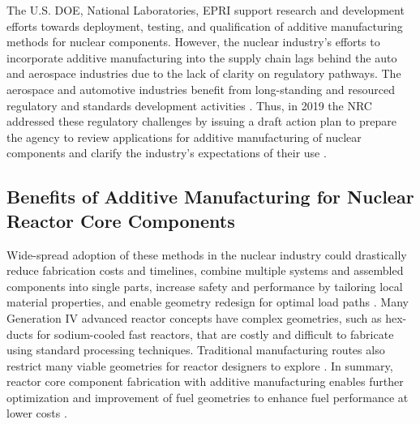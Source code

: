 The U.S. \gls{DOE}, National Laboratories, \gls{EPRI} support research and 
development efforts towards deployment, testing, and qualification 
of additive manufacturing methods for nuclear components. 
However, the nuclear industry's efforts to incorporate additive manufacturing 
into the supply chain lags behind the auto and aerospace industries due to the 
lack of clarity on regulatory pathways. 
The aerospace and automotive industries benefit from long-standing and resourced 
regulatory and standards development activities \cite{noauthor_roadmap_nodate}. 
Thus, in 2019 the \gls{NRC} addressed these regulatory challenges by issuing 
a draft action plan to prepare the agency to review applications for 
additive manufacturing of nuclear components and clarify the industry's 
expectations of their use \cite{noauthor_roadmap_nodate}.

\subsection{Benefits of Additive Manufacturing for Nuclear Reactor Core Components}
\label{sec:am}
Wide-spread adoption of these methods in the nuclear industry could drastically 
reduce fabrication costs and timelines, combine multiple systems and assembled 
components into single parts, increase safety and performance by tailoring 
local material properties, and enable geometry redesign for optimal load paths 
\cite{simpson_considerations_2019}. 
Many Generation IV advanced reactor concepts have complex geometries, 
such as hex-ducts for sodium-cooled fast reactors, that are costly and difficult 
to fabricate using standard processing techniques. 
Traditional manufacturing routes also restrict many viable geometries for 
reactor designers to explore \cite{sridharan_performance_2019}.  
In summary, reactor core component fabrication with additive manufacturing 
enables further optimization and improvement of fuel geometries to enhance fuel 
performance at lower costs \cite{bergeron_early_2018}. 

